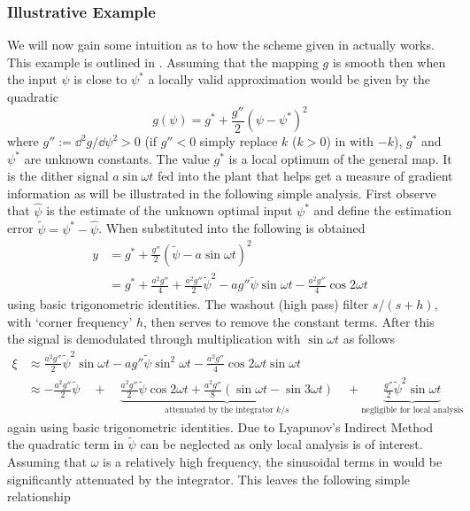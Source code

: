 \subsubsection{Illustrative Example}
We will now gain some intuition as to how the scheme given in  actually works. This example is outlined in \cite{ArKr03}. Assuming that the mapping $g$ is smooth then when the input $\psi$ is close to $\psi^*$ a locally valid approximation would be given by the quadratic
\begin{equation}
\label{eqn:staticmap}
g(\psi) = g^* + \frac{g''}{2}(\psi - \psi^*)^2
\end{equation}
where $g'':= \dd^2 g/\dd\psi^2 >0$ (if $g''<0$ simply replace $k$ ($k>0$) in  with $-k$), $g^*$ and $\psi^*$ are unknown constants. The value $g^*$ is a local optimum of the general map. It is the dither signal $a \sin \omega t$ fed into the plant that helps get a measure of gradient information as will be illustrated in the following simple analysis. First observe that $\hat\psi$ is the estimate of the unknown optimal input $\psi^*$ and define the estimation error $\tilde{\psi} = \psi^* - \hat\psi$. When substituted into  the following is obtained
\begin{align*}
y &= g^* + \frac{g''}{2}(\tilde\psi - a \sin \omega t)^2\\
&= g^* + \frac{a^2g''}{4} + \frac{a^2g''}{2}\tilde\psi^2 - ag''\tilde\psi\sin\omega t - \frac{a^2g''}{4}\cos2\omega t
\end{align*}
using basic trigonometric identities. The washout (high pass) filter $s/(s+h)$, with `corner frequency' $h$, then serves to remove the constant terms. After this the signal is demodulated through multiplication with $\sin \omega t$ as follows
\begin{align}
\nonumber\xi &\approx \frac{a^2g''}{2}\tilde\psi^2\sin\omega t - ag''\tilde\psi\sin^2\omega t - \frac{a^2g''}{4}\cos2\omega t\sin\omega t\\
&\approx  -\frac{a^2g''}{2}\tilde\psi  \quad+\quad  
\underbrace{\frac{a^2g''}{2}\tilde\psi\cos2\omega t + \frac{a^2g''}{8}(\sin\omega t - \sin3\omega t)}_
{\text{attenuated by the integrator } k/s} 
\quad+\!\!\!\!\!\!
\underbrace{\frac{g''}{2}\tilde\psi^2\sin\omega t }_{\text{negligible for local analysis}}
\label{eqn:xi}
\end{align}
again using basic trigonometric identities. Due to Lyapunov's Indirect Method the quadratic term in $\tilde\psi$ can be neglected as only local analysis is of interest. Assuming that $\omega$ is a relatively high frequency, the sinusoidal terms in  would be significantly attenuated by the integrator. This leaves the following simple relationship
